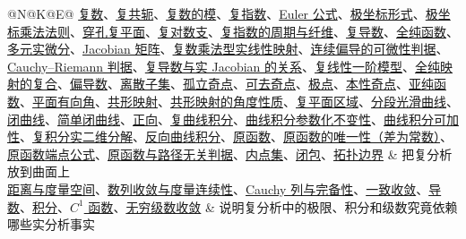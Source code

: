 \documentclass[UTF8,fontset=none,a4paper,11pt]{ctexart}
\theoremstyle{foundation-definition}
\theoremstyle{foundation-theorem}
\theoremstyle{foundation-proposition}
\theoremstyle{foundation-example}
\theoremstyle{foundation-remark}
\theoremstyle{foundation-theorem}
\newcommand{\term}[2]{\hyperref[#1]{#2}}
\begin{document}
\begin{longtable}{@{}N@{\hspace{0.015\textwidth}}K@{\hspace{0.015\textwidth}}E@{}}
\term{def:complex-number}{复数}、\term{def:complex-conjugate}{复共轭}、\term{def:complex-modulus}{复数的模}、\term{def:complex-exponential}{复指数}、\term{thm:euler-formula}{Euler 公式}、\term{def:polar-form}{极坐标形式}、\term{prop:polar-multiplication}{极坐标乘法法则}、\term{def:punctured-plane}{穿孔复平面}、\term{def:complex-logarithm}{复对数支}、\term{prop:complex-exponential-fibers}{复指数的周期与纤维}、\term{def:complex-derivative}{复导数}、\term{def:holomorphic}{全纯函数}、\term{def:total-differential}{多元实微分}、\term{def:jacobian-matrix}{Jacobian 矩阵}、\term{def:complex-multiplication-linear-map}{复数乘法型实线性映射}、\term{prop:continuous-partials-differentiable}{连续偏导的可微性判据}、\term{prop:complex-differential-cr}{Cauchy--Riemann 判据}、\term{prop:complex-jacobian-modulus}{复导数与实 Jacobian 的关系}、\term{prop:complex-first-order-model}{复线性一阶模型}、\term{prop:holomorphic-composition}{全纯映射的复合}、\term{def:partial-derivative}{偏导数}、\term{def:discrete-subset}{离散子集}、\term{def:isolated-singularity}{孤立奇点}、\term{def:removable-singularity}{可去奇点}、\term{def:pole}{极点}、\term{def:essential-singularity}{本性奇点}、\term{def:meromorphic}{亚纯函数}、\term{def:oriented-angle}{平面有向角}、\term{def:conformal}{共形映射}、\term{prop:conformal-angle}{共形映射的角度性质}、\term{def:complex-domain}{复平面区域}、\term{def:piecewise-smooth-curve}{分段光滑曲线}、\term{def:complex-closed-curve}{闭曲线}、\term{def:simple-closed-curve}{简单闭曲线}、\term{def:positive-orientation}{正向}、\term{def:complex-line-integral}{复曲线积分}、\term{prop:curve-integral-reparam}{曲线积分参数化不变性}、\term{prop:curve-integral-concatenation}{曲线积分可加性}、\term{prop:complex-integral-real-form}{复积分实二维分解}、\term{prop:reverse-curve-integral}{反向曲线积分}、\term{def:primitive-complex}{原函数}、\term{prop:primitive-uniqueness}{原函数的唯一性（差为常数）}、\term{prop:primitive-path-integral}{原函数端点公式}、\term{thm:primitive-path-independence}{原函数与路径无关判据}、\term{def:interior}{内点集}、\term{def:closure}{闭包}、\term{def:topological-boundary}{拓扑边界} & 把复分析放到曲面上 \\
\term{def:metric-space}{距离与度量空间}、\term{def:analysis-foundations}{数列收敛与度量连续性}、\term{def:cauchy-complete}{Cauchy 列与完备性}、\term{def:uniform-convergence}{一致收敛}、\term{def:derivative}{导数}、\term{def:integral}{积分}、\term{def:c1-function}{\(C^1\) 函数}、\term{def:series-convergence}{无穷级数收敛} & 说明复分析中的极限、积分和级数究竟依赖哪些实分析事实 \\

\end{longtable}
\end{document}
